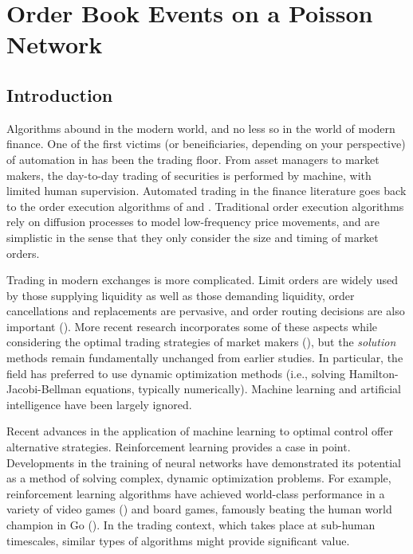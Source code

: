 \chapter{Order Book Events on a Poisson Network}
\label{chapter:four}


\section{Introduction}
	Algorithms abound in the modern world, and no less so in the world of modern finance. One of the first victims (or beneificiaries, depending on your perspective) of automation in has been the trading floor. From asset managers to market makers, the day-to-day trading of securities is performed by machine, with limited human supervision. Automated trading in the finance literature goes back to the order execution algorithms of \cite{Almgren2000} and \cite{Bertsimas1998}. Traditional order execution algorithms rely on diffusion processes to model low-frequency price movements, and are simplistic in the sense that they only consider the size and timing of market orders.

	Trading in modern exchanges is more complicated. Limit orders are widely used by those supplying liquidity as well as those demanding liquidity, order cancellations and replacements are pervasive, and order routing decisions are also important (\cite{Cont2017}). More recent research incorporates some of these aspects while considering the optimal trading strategies of market makers (\cite{Guilbaud2013, Xu2015}), but the \textit{solution} methods remain fundamentally unchanged from earlier studies. In particular, the field has preferred to use dynamic optimization methods (i.e., solving Hamilton-Jacobi-Bellman equations, typically numerically). Machine learning and artificial intelligence have been largely ignored.

	Recent advances in the application of machine learning to optimal control offer alternative strategies. Reinforcement learning provides a case in point. Developments in the training of neural networks have demonstrated its potential as a method of solving complex, dynamic optimization problems. For example, reinforcement learning algorithms have achieved world-class performance in a variety of video games (\cite{Mnih2015}) and board games, famously beating the human world champion in Go (\cite{Silver2017}). In the trading context, which takes place at sub-human timescales, similar types of algorithms might provide significant value.

